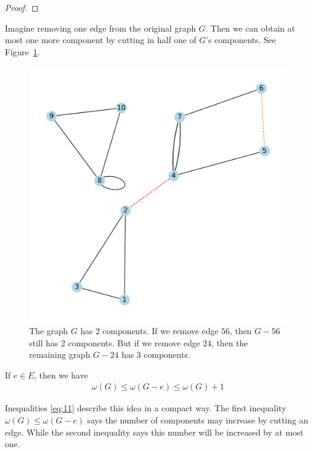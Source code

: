 \documentclass[thmcnt=section, 12pt, color=cyan]{my-elegantbook}
\begin{document}
\begin{proof}
\end{proof}


Imagine removing one edge from the original graph $G$.
Then we can obtain at most one more component 
by cutting in half one of $G$'s components.
See Figure~\ref{fig:5}.

\begin{figure}[ht]
    \centering
    \includegraphics[scale=0.5]{figures/g-005.png}
    \caption{
		The graph $G$ has 2 components.
		If we remove edge $56$, 
		then $G-56$ still has 2 components.
		But if we remove edge $24$, then 
		the remaining graph $G-24$ has 3 components.
	}
    \label{fig:5}
\end{figure}

\begin{proposition}\label{pro:6}
    If $e \in E$, then we have 
	\begin{align}
		\omega(G) \leq \omega(G-e)
		\leq \omega(G) + 1 
		\label{eq:11}
	\end{align}
\end{proposition}

Inequalities \eqref{eq:11} describe this idea in a compact way.
The first inequality $\omega(G) \leq \omega(G-e)$
says the number of components may increase by cutting an edge.
While the second inequality says this number will be increased 
by at most one.
\end{document}

